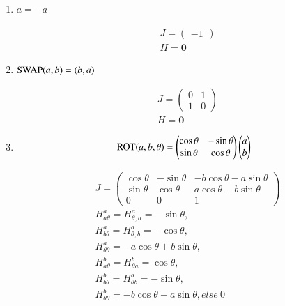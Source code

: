 \documentclass[aps,twocolumn,longbibliography,english,superscriptaddress]{revtex4-1}
\newcommand{\<}{\langle}
\renewcommand{\>}{\rangle}
\theoremstyle{definition}\newtheorem{definition}{\textit{Definition}}
\begin{document}
\begin{enumerate}
\item $a = -a$

\begin{align*}
    &J = \left(\begin{matrix}
-1
\end{matrix}\right)\\
    &H = \mathbf{0}
\end{align*}

\item ${\rm SWAP}(a, b) = (b, a)$

\begin{align*}
    &J = \left(\begin{matrix}
0 & 1 \\
1 & 0
\end{matrix}\right)\\
    &H = \mathbf{0}
\end{align*}

\item \begin{align*}
{\rm ROT}(a, b, \theta)  = \left(\begin{matrix}
        \cos\theta & - \sin\theta\\
        \sin\theta  & \cos\theta
    \end{matrix}\right)
    \left(\begin{matrix}
        a\\
        b
    \end{matrix}\right)
\end{align*}

\begin{align*}
    &J = \left(\begin{matrix}
        \cos\theta & - \sin\theta & -b\cos\theta-a\sin \theta\\
        \sin\theta  & \cos\theta & a\cos\theta -b\sin\theta\\
        0 & 0 & 1
    \end{matrix}\right)\\
    &H^a_{a\theta} = H^a_{\theta, a} = -\sin\theta,\\
    &H^a_{b\theta} = H^a_{\theta, b} = -\cos\theta,\\
    &H^a_{\theta\theta} = -a\cos\theta + b\sin\theta,\\
    &H^b_{a\theta} = H^b_{\theta a} = \cos\theta,\\
    &H^b_{b\theta} = H^b_{\theta b} = -\sin\theta,\\
    &H^b_{\theta\theta} = -b\cos\theta-a\sin\theta, else ~0
\end{align*}
\end{enumerate}
\end{document}
